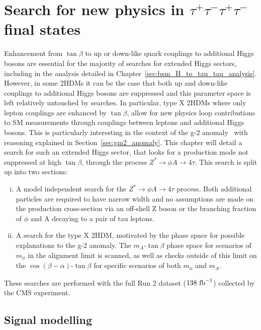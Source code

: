 \chapter{\texorpdfstring{Search for new physics in $\tau^+\tau^-\tau^+\tau^-$ final states}{Search for new physics in tautautautau final states}}
\label{sec:H_A_to_4_tau_analysis}

Enhancement from $\tan\beta$ to up or down-like quark couplings to additional Higgs bosons are essential for the majority of searches for extended Higgs sectors, including in the analysis detailed in Chapter~\ref{sec:bsm_H_to_tau_tau_analysis}.
However, in some \ac{2HDM}s it can be the case that both up and down-like couplings to additional Higgs bosons are suppressed and this parameter space is left relatively untouched by  searches.
In particular, type X \ac{2HDM}s where only lepton couplings are enhanced by $\tan\beta$, allow for new physics loop contributions to \ac{SM} measurements through couplings between leptons and additional Higgs bosons.
This is particularly interesting in the context of the g-2 anomaly~\cite{Muong-2:2006rrc,Muong-2:2021ojo} with reasoning explained in Section~\ref{sec:gm2_anomaly}.
This chapter will detail a search for such an extended Higgs sector, that looks for a production mode not suppressed at high $\tan\beta$, through the process $Z^{*}\rightarrow \phi A \rightarrow 4\tau$.
This search is split up into two sections:

\begin{enumerate}[i)]
  \item A model independent search for the $Z^{*}\rightarrow \phi A \rightarrow 4\tau$ process. Both additional particles are required to have narrow width and no assumptions are made on the production cross-section via an off-shell Z boson or the branching fraction of $\phi$ and A decaying to a pair of tau leptons.
   \item A search for the type X \ac{2HDM}, motivated by the phase space for possible explanations to the g-2 anomaly. The $m_{A}$-$\tan\beta$ phase space for scenarios of $m_\phi$ in the alignment limit is scanned, as well as checks outside of this limit on the $\cos(\beta-\alpha)$-$\tan\beta$ for specific scenarios of both $m_\phi$ and $m_A$.
\end{enumerate}

These searches are performed with the full Run 2 dataset ($138 \text{ fb}^{-1}$) collected by the \ac{CMS} experiment. 

\section{Signal modelling}
\label{sec:4tau_signal_modelling}

